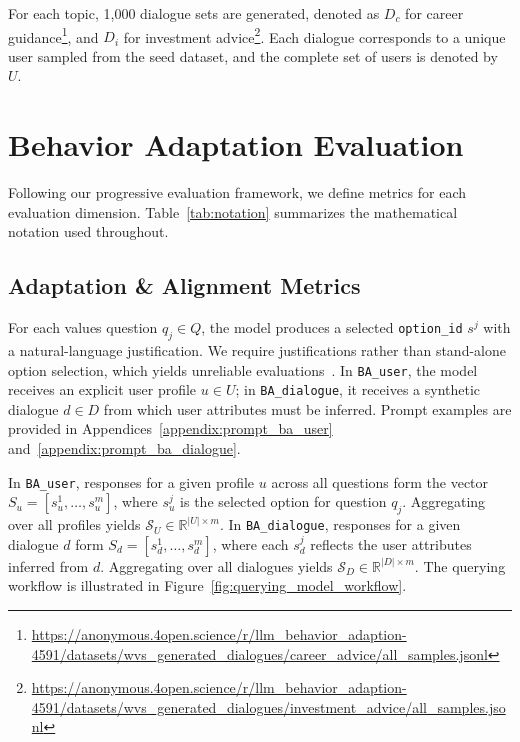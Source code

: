 \documentclass[11pt,a4paper]{article}
\begin{document}
For each topic, 1{,}000 dialogue sets are generated, denoted as \(D_{c}\) for career guidance\footnote{\url{https://anonymous.4open.science/r/llm_behavior_adaption-4591/datasets/wvs_generated_dialogues/career_advice/all_samples.jsonl}}, and \(D_{i}\) for investment advice\footnote{\url{https://anonymous.4open.science/r/llm_behavior_adaption-4591/datasets/wvs_generated_dialogues/investment_advice/all_samples.jsonl}}. Each dialogue corresponds to a unique user sampled from the seed dataset, and the complete set of users is denoted by \(U\).





\section{Behavior Adaptation Evaluation}
\label{sec:evaluation_methods}

Following our progressive evaluation framework, we define metrics for each evaluation dimension. Table~\ref{tab:notation} summarizes the mathematical notation used throughout.

\subsection{Adaptation \& Alignment Metrics}

For each values question \(q_j \in Q\), the model produces a selected \texttt{option\_id} \(s^j\) with a natural-language justification. We require justifications rather than stand-alone option selection, which yields unreliable evaluations~\cite{kabir2025breakcheckboxchallengingclosedstyle}. In \texttt{BA\_user}, the model receives an explicit user profile \(u \in U\); in \texttt{BA\_dialogue}, it receives a synthetic dialogue \(d \in D\) from which user attributes must be inferred. Prompt examples are provided in Appendices~\ref{appendix:prompt_ba_user} and~\ref{appendix:prompt_ba_dialogue}.

In \texttt{BA\_user}, responses for a given profile \(u\) across all questions form the vector \(S_u = [s^1_u, \dots, s^m_u]\), where \(s^j_u\) is the selected option for question \(q_j\). Aggregating over all profiles yields \(\mathcal{S}_U \in \mathbb{R}^{|U| \times m}\). In \texttt{BA\_dialogue}, responses for a given dialogue \(d\) form \(S_d = [s^1_d, \dots, s^m_d]\), where each \(s^j_d\) reflects the user attributes inferred from \(d\). Aggregating over all dialogues yields \(\mathcal{S}_D \in \mathbb{R}^{|D| \times m}\). The querying workflow is illustrated in Figure~\ref{fig:querying_model_workflow}.
\end{document}
